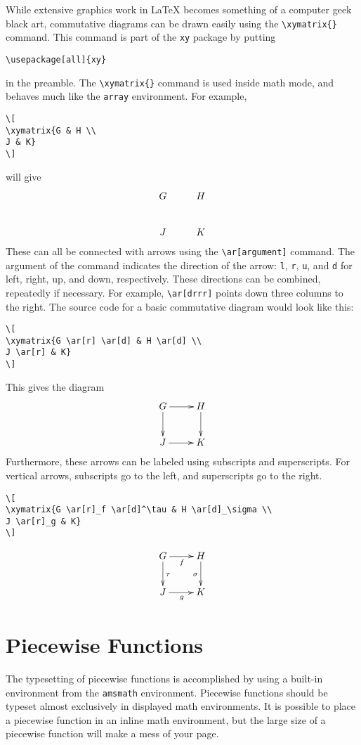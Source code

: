 While extensive graphics work in \LaTeX{} becomes something of a
computer geek black art, commutative diagrams can be drawn easily
using the \verb_\xymatrix{}_ command.  This command is part of the
\verb_xy_ package by putting
\begin{verbatim}
\usepackage[all]{xy}
\end{verbatim}
in the preamble.  The \verb_\xymatrix{}_ command is used inside math
mode, and behaves much like the \verb_array_ environment.  For
example,
\begin{verbatim}
\[
\xymatrix{G & H \\
J & K}
\]
\end{verbatim}
will give
\[
\xymatrix{G & H \\
  J & K}
\]
These can all be connected with arrows using the \verb_\ar[argument]_
command.  The argument of the command indicates the direction of the
arrow: \texttt{l}, \texttt{r}, \texttt{u}, and \texttt{d} for left,
right, up, and down, respectively.  These directions can be combined,
repeatedly if necessary.  For example, \verb_\ar[drrr]_ points down
three columns to the right.  The source code for a basic commutative
diagram would look like this:
\begin{verbatim}
\[
\xymatrix{G \ar[r] \ar[d] & H \ar[d] \\
J \ar[r] & K}
\]
\end{verbatim}
  This gives the diagram
  \[
  \xymatrix{G \ar[r] \ar[d] & H \ar[d] \\
    J \ar[r] & K}
  \]
  Furthermore, these arrows can be labeled using subscripts and
  superscripts.  For vertical arrows, subscripts go to the left, and
  superscripts go to the right.
\begin{verbatim}
\[
\xymatrix{G \ar[r]_f \ar[d]^\tau & H \ar[d]_\sigma \\
J \ar[r]_g & K}
\]
\end{verbatim}
\[
\xymatrix{G \ar[r]_f \ar[d]^\tau & H \ar[d]_\sigma \\
J \ar[r]_g & K}
\]

\section{Piecewise Functions}
\label{sec:piecewise-functions}

The typesetting of piecewise functions is accomplished 
by using a built-in environment from the \verb_amsmath_
environment.  Piecewise functions should be typeset almost exclusively
in displayed math environments.  It is possible to place a piecewise
function in an inline math environment, but the large size of a
piecewise function will make a mess of your page.

